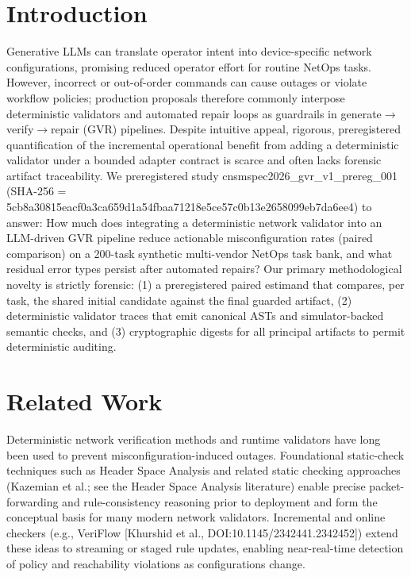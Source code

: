 \documentclass[conference]{IEEEtran}
\begin{document}
\section{Introduction}
Generative LLMs can translate operator intent into device-specific network configurations, promising reduced operator effort for routine NetOps tasks. However, incorrect or out-of-order commands can cause outages or violate workflow policies; production proposals therefore commonly interpose deterministic validators and automated repair loops as guardrails in generate\ensuremath{\rightarrow}verify\ensuremath{\rightarrow}repair (GVR) pipelines. Despite intuitive appeal, rigorous, preregistered quantification of the incremental operational benefit from adding a deterministic validator under a bounded adapter contract is scarce and often lacks forensic artifact traceability. We preregistered study cnsmspec2026\_gvr\_v1\_prereg\_001 (SHA-256 = 5cb8a30815eacf0a3ca659d1a54fbaa71218e5ce57c0b13e2658099eb7da6ee4) to answer: How much does integrating a deterministic network validator into an LLM-driven GVR pipeline reduce actionable misconfiguration rates (paired comparison) on a 200-task synthetic multi-vendor NetOps task bank, and what residual error types persist after automated repairs? Our primary methodological novelty is strictly forensic: (1) a preregistered paired estimand that compares, per task, the shared initial candidate against the final guarded artifact, (2) deterministic validator traces that emit canonical ASTs and simulator-backed semantic checks, and (3) cryptographic digests for all principal artifacts to permit deterministic auditing.

\section{Related Work}
Deterministic network verification methods and runtime validators have long been used to prevent misconfiguration-induced outages. Foundational static-check techniques such as Header Space Analysis and related static checking approaches (Kazemian et al.; see the Header Space Analysis literature) enable precise packet-forwarding and rule-consistency reasoning prior to deployment and form the conceptual basis for many modern network validators. Incremental and online checkers (e.g., VeriFlow [Khurshid et al., DOI:10.1145/2342441.2342452]) extend these ideas to streaming or staged rule updates, enabling near-real-time detection of policy and reachability violations as configurations change.
\end{document}
